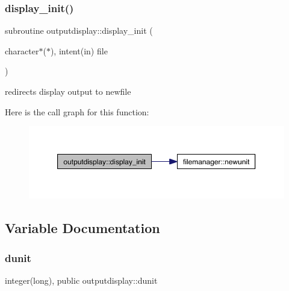 \subsubsection{\texorpdfstring{display\+\_\+init()}{display\_init()}}
{\footnotesize\ttfamily subroutine outputdisplay\+::display\+\_\+init (\begin{DoxyParamCaption}\item[{character$\ast$($\ast$), intent(in)}]{file }\end{DoxyParamCaption})\hspace{0.3cm}{\ttfamily [private]}}



redirects display output to newfile 

Here is the call graph for this function\+:\nopagebreak
\begin{figure}[H]
\begin{center}
\leavevmode
\includegraphics[width=350pt]{namespaceoutputdisplay_a9a8a15080a89f2947af09f8fb326a2e0_cgraph}
\end{center}
\end{figure}


\subsection{Variable Documentation}
\mbox{\label{namespaceoutputdisplay_a37a1610ae7e198bc24d119cea584a6f2}} 
\subsubsection{\texorpdfstring{dunit}{dunit}}
{\footnotesize\ttfamily integer(long), public outputdisplay\+::dunit}

